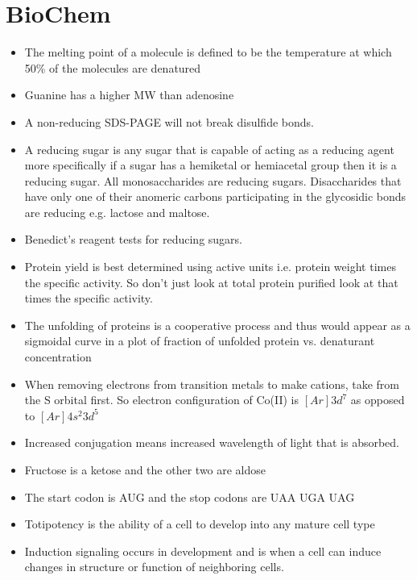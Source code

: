 \documentclass[11pt]{article}
\begin{document}
\section{BioChem}
\begin{itemize}
  \item The melting point of a molecule is defined to be the temperature at
    which 50\% of the molecules are denatured
  \item Guanine has a higher MW than adenosine
  \item A non-reducing SDS-PAGE will not break disulfide bonds.
  \item A reducing sugar is any sugar that is capable of acting as a reducing
    agent more specifically if a sugar has a hemiketal or hemiacetal group then
    it is a reducing sugar. All monosaccharides are reducing sugars.
    Disaccharides that have only one of their anomeric carbons participating in
    the glycosidic bonds are reducing e.g. lactose and maltose.
  \item Benedict's reagent tests for reducing sugars.
  \item Protein yield is best determined using active units i.e. protein weight
    times the specific activity. So don't just look at total protein purified
    look at that times the specific activity.
  \item The unfolding of proteins is a cooperative process and thus would appear
    as a sigmoidal curve in a plot of fraction of unfolded protein vs.
    denaturant concentration
  \item When removing electrons from transition metals to make cations, take
    from the S orbital first. So electron configuration of Co(II) is
    $ [Ar]3d^{7} $ as opposed to $ [Ar]4s^{2}3d^{5} $
  \item Increased conjugation means increased wavelength of light that is
    absorbed.
  \item Fructose is a ketose and the other two are aldose
  \item The start codon is AUG and the stop codons are UAA UGA UAG
  \item Totipotency is the ability of a cell to develop into any mature cell
    type
  \item Induction signaling occurs in development and is when a cell can induce
    changes in structure or function of neighboring cells.
\end{itemize}
\end{document}
